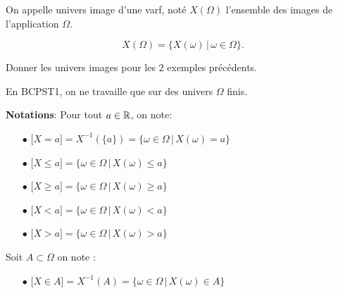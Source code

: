 \documentclass[a4paper, 11pt]{article}
\begin{document}


 {  

\begin{defi} On appelle univers image d'une varf, not\'e  $X(\Omega)$ l'ensemble des images de l'application $\Omega$. 

$$X(\Omega) = \{X(\omega) \, |\, \omega \in \Omega\}.$$ 
\end{defi}
 
}

\begin{exemple}
Donner les univers images pour les $2$ exemples pr\'ec\'edents.

\end{exemple}

\begin{rem}
En BCPST1, on ne travaille que sur des univers $\Omega$ finis. 

\end{rem}







 \textbf{Notations}: Pour tout $a\in\mathbb{R}$, on note:\vsec
\begin{itemize}
\item[$\bullet$] $\lbrack X=a\rbrack=X^{-1}(\{a\})=\{ \omega \in \Omega \, |\, X(\omega) = a\}$
\item[$\bullet$]  $\lbrack X\leq a\rbrack=\{ \omega \in \Omega \, |\, X(\omega) \leq a\}$
\item[$\bullet$]  $\lbrack X\geq a\rbrack=\{ \omega \in \Omega \, |\, X(\omega) \geq  a\}$
\item[$\bullet$]  $\lbrack X< a\rbrack=\{ \omega \in \Omega \, |\, X(\omega) < a\}$
\item[$\bullet$]  $\lbrack X> a\rbrack=\{ \omega \in \Omega \, |\, X(\omega) > a\}$
\end{itemize}
Soit $A\subset \Omega$ on note :
\begin{itemize}
\item[$\bullet$] $\lbrack X\in A \rbrack=X^{-1}(A)=\{ \omega \in \Omega \, |\, X(\omega) \in A\}$
\end{itemize}
\end{document}
